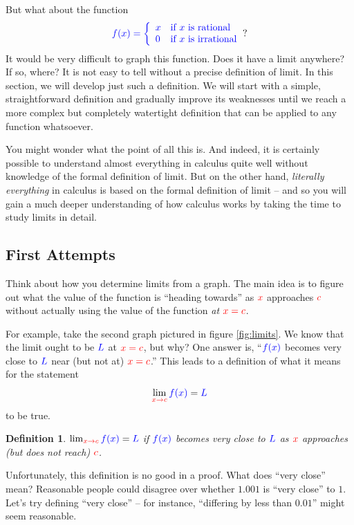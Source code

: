 \documentclass{myarticle}
\newcommand{\hor}[1]{\textcolor{red}{#1}}
\newcommand{\ver}[1]{\textcolor{blue}{#1}}
\theoremstyle{nospace}
\newtheorem*{oldattempt}{Definition}
\newenvironment{attempt}
{\begin{mdframed}\begin{oldattempt}}
    {\end{oldattempt}\end{mdframed}}
\newtheorem{old series theorem}{Theorem}
\newenvironment{series theorem}
{\begin{mdframed}\begin{old series theorem}}
    {\end{old series theorem}\end{mdframed}}
\begin{document}
But what about the function
\[
  \ver{f(x) = \left\{
      \begin{array}{ll}
        x & \text{if $x$ is rational} \\
        0 & \text{if $x$ is irrational} \\
      \end{array}\right.}?
  \label{eq:dirichlet}
\]
It would be very difficult to graph this function. Does it have a
limit anywhere? If so, where? It is not easy to tell without a precise
definition of limit. In this section, we will develop just such a
definition. We will start with a simple, straightforward definition
and gradually improve its weaknesses until we reach a more complex but
completely watertight definition that can be applied to any function
whatsoever.

You might wonder what the point of all this is. And indeed, it is
certainly possible to understand almost everything in calculus quite
well without knowledge of the formal definition of limit. But on the
other hand, \emph{literally everything} in calculus is based on the
formal definition of limit -- and so you will gain a much deeper
understanding of how calculus works by taking the time to study limits
in detail.

\subsection{First Attempts}
\label{sec:first attempts}

Think about how you determine limits from a graph. The main idea is to
figure out what the value of the function is ``heading towards'' as
$\hor{x}$ approaches $\hor{c}$ without actually using the value of the
function \emph{at} $\hor{x = c}$.

For example, take the second graph pictured in figure
\ref{fig:limits}. We know that the limit ought to be $\ver{L}$ at
$\hor{x = c}$, but why? One answer is, ``$\ver{f(x)}$ becomes very
close to $\ver{L}$ near (but not at) $\hor{x = c}$.'' This leads to a
definition of what it means for the statement
\[
  \lim_{\hor{x \to c}} \ver{f(x)} = \ver{L}
\]
to be true.

\begin{attempt}
  $\lim_{\hor{x \to c}} \ver{f(x)} = \ver{L}$ if $\ver{f(x)}$ becomes
  very close to $\ver{L}$ as $\hor{x}$ approaches (but does not reach)
  $\hor{c}$.
\end{attempt}

Unfortunately, this definition is no good in a proof. What does ``very
close'' mean? Reasonable people could disagree over whether $1.001$ is
``very close'' to $1$. Let's try defining ``very close'' -- for
instance, ``differing by less than $0.01$'' might seem reasonable.
\end{document}
